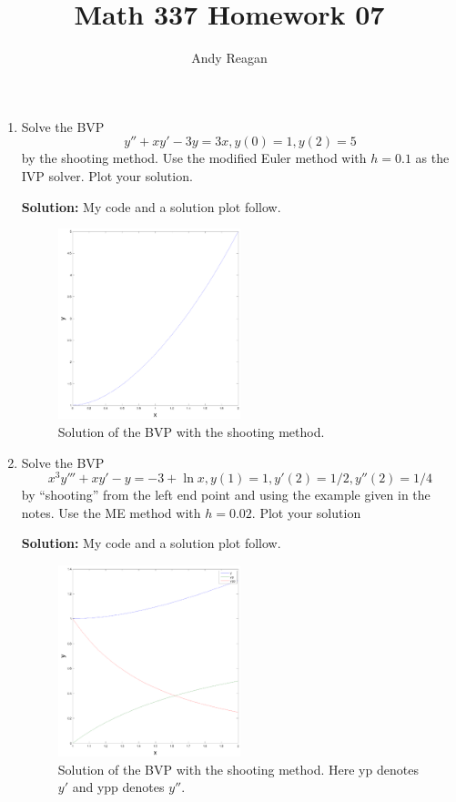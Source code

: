 \documentclass[11pt]{article}
\author{Andy Reagan}
\title{Math 337 Homework 07}
\begin{document}
\maketitle

\begin{enumerate}

\item Solve the BVP
\[ y'' + xy' - 3y = 3x, y(0) = 1, y(2) = 5 \]
by the shooting method.
Use the modified Euler method with $h = 0.1$ as the IVP solver.
Plot your solution.

\bigskip
\textbf{Solution:} My code and a solution plot follow.



\begin{figure}[h!]
  \centering
    \includegraphics[width=0.5\textwidth]{andy_hw07_prb01_01.pdf}
  \caption{Solution of the BVP with the shooting method.}
\end{figure}

\item Solve the BVP
\[ x^3 y''' + xy' -y = -3 + \ln x, y(1) = 1, y'(2) = 1/2, y''(2) = 1/4 \]
by ``shooting'' from the left end point and using the example given in the notes.
Use the ME method with $h = 0.02$.
Plot your solution

\bigskip
\textbf{Solution:} My code and a solution plot follow.



\begin{figure}[h!]
  \centering
    \includegraphics[width=0.5\textwidth]{andy_hw07_prb02_01.pdf}
  \caption{Solution of the BVP with the shooting method. Here yp denotes $y'$ and ypp denotes $y''$.}
\end{figure}


\end{enumerate}
\end{document}
